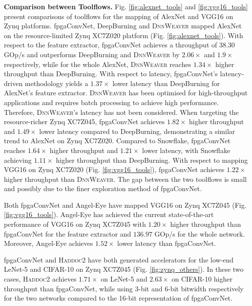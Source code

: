 \documentclass[format=acmsmall, review=false, screen=true]{acmart}
\begin{document}
\textbf{Comparison between Toolflows.}
Fig. \ref{fig:alexnet_tools} and \ref{fig:vgg16_tools} present comparisons of toolflows for the mapping of AlexNet and VGG16 on Zynq platforms. fpgaConvNet, DeepBurning and \textsc{DnnWeaver} mapped AlexNet on the resource-limited Zynq XC7Z020 platform (Fig. \ref{fig:alexnet_tools}). With respect to the feature extractor, fpgaConvNet achieves a throughput of $38.30$ GOp/s and outperforms DeepBurning and \textsc{DnnWeaver} by $2.06 \times$ and $1.9 \times$ respectively, while for the whole AlexNet, \textsc{DnnWeaver} reaches $1.34 \times$ higher throughput than DeepBurning. With respect to latency, fpgaConvNet's latency-driven methodology yields a $1.37 \times$ lower latency than DeepBurning for AlexNet's feature extractor. \textsc{DnnWeaver} has been optimised for high-throughput applications and requires batch processing to achieve high performance. Therefore, \textsc{DnnWeaver}'s latency has not been considered. When targeting the resource-richer Zynq XC7Z045, fpgaConvNet achieves $1.82 \times$ higher throughput and $1.49 \times$ lower latency compared to DeepBurning, demonstrating a similar trend to AlexNet on Zynq XC7Z020. {\color{black}Compared to Snowflake, fpgaConvNet reaches $1.64 \times$ higher throughput and $1.21\times$ lower latency, with Snowflake achieving $1.11\times$ higher throughput than DeepBurning.} With respect to mapping VGG16 on Zynq XC7Z020 (Fig. \ref{fig:vgg16_tools}), fpgaConvNet achieves $1.22 \times$ higher throughput than \textsc{DnnWeaver}. The gap between the two toolflows is small and possibly due to the finer exploration method of fpgaConvNet.




Both fpgaConvNet and Angel-Eye have mapped VGG16 on Zynq XC7Z045 (Fig. \ref{fig:vgg16_tools}). Angel-Eye has achieved the current state-of-the-art performance of VGG16 on Zynq XC7Z045 with $1.20 \times$ higher throughput than fpgaConvNet for the feature extractor and $136.97$ GOp/s for the whole network. Moreover, Angel-Eye achieves $1.52 \times$ lower latency than fpgaConvNet. 

{\color{black}fpgaConvNet and \textsc{Haddoc2} have both generated accelerators for the low-end LeNet-5 and CIFAR-10 on Zynq XC7Z045 (Fig. \ref{fig:zynq_others}). In these two cases, \textsc{Haddoc2} achieves $1.71\times$ on LeNet-5 and $2.63\times$ on CIFAR-10 higher throughput than fpgaConvNet, while using 3-bit and 6-bit bitwidth respectively for the two networks compared to the 16-bit representation of fpgaConvNet.}
\end{document}

